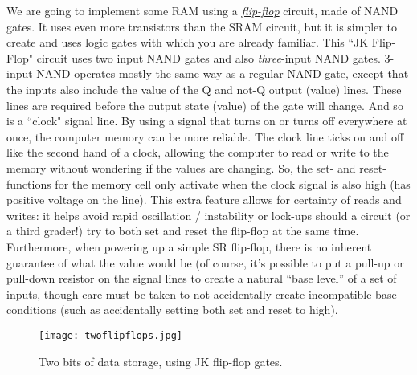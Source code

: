 We are going to implement some RAM using a {\color{webblue}\href{https://www.electronics-tutorials.ws/sequential/seq_2.html}{\emph{flip-flop}}} circuit, made of NAND gates.
It uses even more transistors than the SRAM circuit, but it is simpler to create and uses logic gates with which you are already familiar. This ``JK Flip-Flop" circuit uses
two input NAND gates and also \emph{three}-input NAND gates. 3-input NAND operates mostly
the same way as a regular NAND gate, except that the inputs also include the value of the 
Q and not-Q output (value) lines. 
These lines are required before the output state (value) of the gate will change. And so is a ``clock" signal line. By using a signal that turns on or turns off everywhere at once, the computer memory can be more reliable. The clock line ticks on and off like the second hand of a clock, allowing the computer to read or write to the memory without wondering if the values are changing.
So, the set- and reset- functions for the memory cell
only activate when the clock signal is also high (has positive voltage on the line).
This extra feature allows for certainty of reads and writes: it helps
avoid rapid oscillation / instability or lock-ups should a circuit (or a third
grader!) try to both set and reset the
flip-flop at the same time. Furthermore, when powering up a simple SR flip-flop,
there is no inherent guarantee of what the value would be (of course, it's
possible to put a pull-up or pull-down resistor on the signal lines to create
a natural ``base level'' of a set of inputs, though care must be taken to 
not accidentally create incompatible base conditions (such as accidentally setting
both set and reset to high).

\begin{figure}
  \begin{center}
    \texttt{[image: twoflipflops.jpg]}
  \caption{Two bits of data storage, using JK flip-flop gates.}
  \end{center}
\end{figure}

